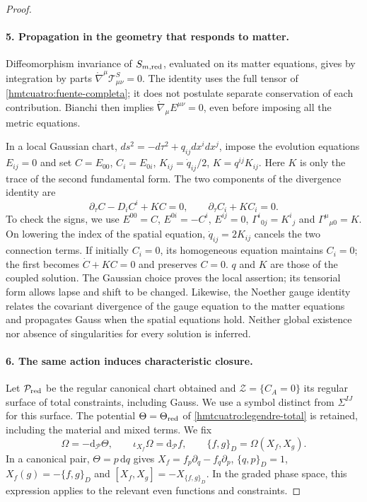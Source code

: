 \begin{proof}
\paragraph{5. Propagation in the geometry that responds to matter.}
Diffeomorphism invariance of \(S_{m,\rm red}\), evaluated on its matter equations, gives by integration by parts \(\mathring\nabla^\mu\mathcal T^S_{\mu\nu}=0\). The identity uses the full tensor of \eqref{hmtcuatro:fuente-completa}; it does not postulate separate conservation of each contribution. Bianchi then implies \(\mathring\nabla_\mu E^{\mu\nu}=0\), even before imposing all the metric equations.

In a local Gaussian chart, \(ds^2=-d\tau^2+q_{ij}dx^idx^j\), impose the evolution equations \(E_{ij}=0\) and set \(C=E_{00}\), \(C_i=E_{0i}\), \(K_{ij}=\dot q_{ij}/2\), \(K=q^{ij}K_{ij}\). Here \(K\) is only the trace of the second fundamental form. The two components of the divergence identity are
\begin{equation}
 \partial_\tau C-D_iC^i+KC=0,\qquad
 \partial_\tau C_i+KC_i=0.
 \label{hmtcuatro:propagacion}
\end{equation}
To check the signs, we use \(E^{00}=C\), \(E^{0i}=-C^i\), \(E^{ij}=0\), \(\Gamma^i{}_{0j}=K^i{}_j\) and \(\Gamma^\mu{}_{\mu0}=K\). On lowering the index of the spatial equation, \(\dot q_{ij}=2K_{ij}\) cancels the two connection terms. If initially \(C_i=0\), its homogeneous equation maintains \(C_i=0\); the first becomes \(\dot C+KC=0\) and preserves \(C=0\). \(q\) and \(K\) are those of the coupled solution. The Gaussian choice proves the local assertion; its tensorial form allows lapse and shift to be changed. Likewise, the Noether gauge identity relates the covariant divergence of the gauge equation to the matter equations and propagates Gauss when the spatial equations hold. Neither global existence nor absence of singularities for every solution is inferred.

\paragraph{6. The same action induces characteristic closure.}
Let \(\mathcal P_{\rm red}\) be the regular canonical chart obtained and \(\mathcal Z=\{C_A=0\}\) its regular surface of total constraints, including Gauss. We use a symbol distinct from \(\Sigma^{IJ}\) for this surface. The potential \(\Theta=\Theta_{\rm red}\) of \eqref{hmtcuatro:legendre-total} is retained, including the material and mixed terms. We fix
\begin{equation}
 \Omega=-\mathrm d_{\mathcal P}\Theta,\qquad
 \iota_{X_f}\Omega=\mathrm d_{\mathcal P}f,\qquad
 \{f,g\}_D=\Omega(X_f,X_g).
 \label{hmtcuatro:convenciones-simpecticas}
\end{equation}
In a canonical pair, \(\Theta=p\,\mathrm dq\) gives \(X_f=f_p\partial_q-f_q\partial_p\), \(\{q,p\}_D=1\), \(X_f(g)=-\{f,g\}_D\) and \([X_f,X_g]=-X_{\{f,g\}_D}\). In the graded phase space, this expression applies to the relevant even functions and constraints.


\end{proof}
